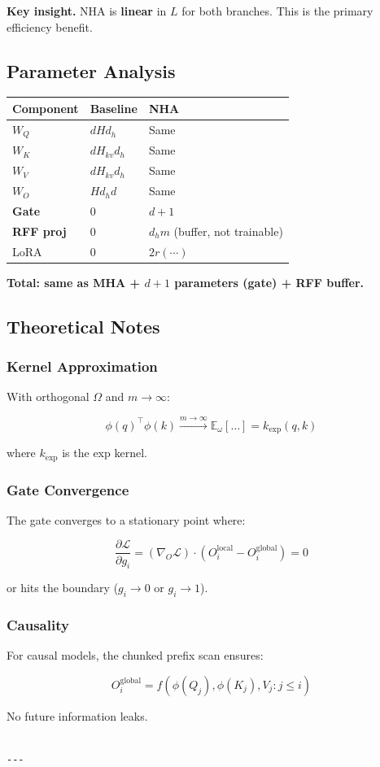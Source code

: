 \textbf{Key insight.} NHA is \textbf{linear} in $L$ for both branches. This is the 
primary efficiency benefit.

\subsection{Parameter Analysis}

\begin{table}[H]
\centering
\small
\begin{tabular}{lll}
\toprule
\textbf{Component} & \textbf{Baseline} & \textbf{NHA} \\
\midrule
$W_Q$ & $d H d_h$ & Same \\
$W_K$ & $d H_{kv} d_h$ & Same \\
$W_V$ & $d H_{kv} d_h$ & Same \\
$W_O$ & $H d_h d$ & Same \\
\textbf{Gate} & 0 & $d + 1$ \\
\textbf{RFF proj} & 0 & $d_h m$ (buffer, not trainable) \\
LoRA & 0 & $2 r (\cdots)$ \\
\bottomrule
\end{tabular}
\end{table}

\textbf{Total: same as MHA + $d + 1$ parameters (gate) + RFF buffer.}

\subsection{Theoretical Notes}

\subsubsection{Kernel Approximation}

With orthogonal $\Omega$ and $m \to \infty$:

\[
\phi(q)^\top \phi(k) \xrightarrow{m \to \infty} \mathbb{E}_\omega[\ldots] = k_\text{exp}(q, k)
\tag{4.13}
\]

where $k_\text{exp}$ is the exp kernel.

\subsubsection{Gate Convergence}

The gate converges to a stationary point where:

\[
\frac{\partial \mathcal{L}}{\partial g_i} = (\nabla_O \mathcal{L}) \cdot (O^\text{local}_i - O^\text{global}_i) = 0
\tag{4.14}
\]

or hits the boundary ($g_i \to 0$ or $g_i \to 1$).

\subsubsection{Causality}

For causal models, the chunked prefix scan ensures:

\[
O_i^\text{global} = f(\phi(Q_j), \phi(K_j), V_j : j \leq i)
\tag{4.15}
\]

No future information leaks.
\begin{lstlisting}

---
\end{lstlisting}